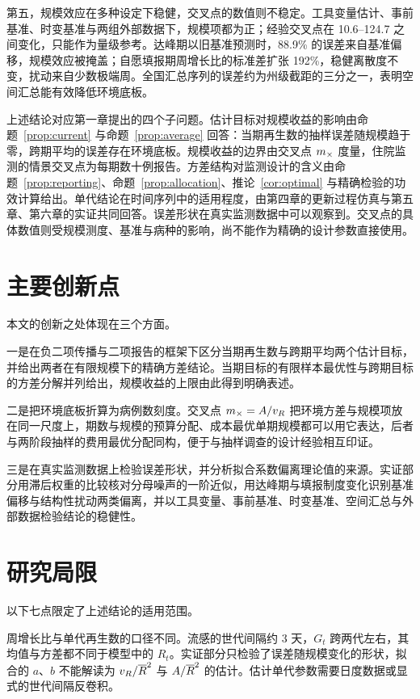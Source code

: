 第五，规模效应在多种设定下稳健，交叉点的数值则不稳定。工具变量估计、事前基准、时变基准与两组外部数据下，规模项都为正；经验交叉点在 10.6--124.7 之间变化，只能作为量级参考。达峰期以旧基准预测时，88.9\% 的误差来自基准偏移，规模效应被掩盖；自愿填报期周增长比的标准差扩张 192\%，稳健离散度不变，扰动来自少数极端周。全国汇总序列的误差约为州级截距的三分之一，表明空间汇总能有效降低环境底板。

上述结论对应第一章提出的四个子问题。估计目标对规模收益的影响由命题~\ref{prop:current} 与命题~\ref{prop:average} 回答：当期再生数的抽样误差随规模趋于零，跨期平均的误差存在环境底板。规模收益的边界由交叉点 $m_{\times}$ 度量，住院监测的情景交叉点为每期数十例报告。方差结构对监测设计的含义由命题~\ref{prop:reporting}、命题~\ref{prop:allocation}、推论~\ref{cor:optimal} 与精确检验的功效计算给出。单代结论在时间序列中的适用程度，由第四章的更新过程仿真与第五章、第六章的实证共同回答。误差形状在真实监测数据中可以观察到。交叉点的具体数值则受规模测度、基准与病种的影响，尚不能作为精确的设计参数直接使用。

\section{主要创新点}
\label{sec:concl-novelty}

本文的创新之处体现在三个方面。

一是在负二项传播与二项报告的框架下区分当期再生数与跨期平均两个估计目标，并给出两者在有限规模下的精确方差结论。当期目标的有限样本最优性与跨期目标的方差分解并列给出，规模收益的上限由此得到明确表述。

二是把环境底板折算为病例数刻度。交叉点 $m_{\times}=A/v_R$ 把环境方差与规模项放在同一尺度上，期数与规模的预算分配、成本最优单期规模都可以用它表达，后者与两阶段抽样的费用最优分配同构，便于与抽样调查的设计经验相互印证。

三是在真实监测数据上检验误差形状，并分析拟合系数偏离理论值的来源。实证部分用滞后权重的比较核对分母噪声的一阶近似，用达峰期与填报制度变化识别基准偏移与结构性扰动两类偏离，并以工具变量、事前基准、时变基准、空间汇总与外部数据检验结论的稳健性。

\section{研究局限}
\label{sec:concl-limits}

以下七点限定了上述结论的适用范围。

周增长比与单代再生数的口径不同。流感的世代间隔约 3 天，$G_t$ 跨两代左右，其均值与方差都不同于模型中的 $R_t$。实证部分只检验了误差随规模变化的形状，拟合的 $a$、$b$ 不能解读为 $v_R/\overline{R}^2$ 与 $A/\overline{R}^2$ 的估计。估计单代参数需要日度数据或显式的世代间隔反卷积。


